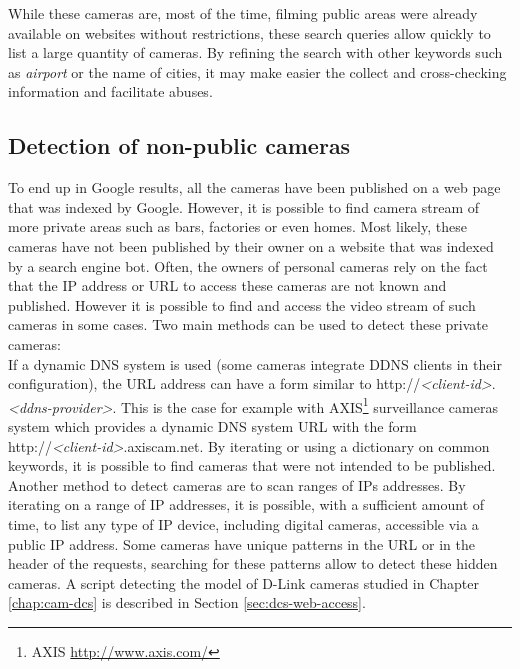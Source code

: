 While these cameras are, most of the time, filming public areas were already available on websites without restrictions, these search queries allow quickly to list a large quantity of cameras.
By refining the search with other keywords such as \emph{airport} or the name of cities, it may make easier the collect and cross-checking information and facilitate abuses.\\

\subsection{Detection of non-public cameras}
\label{sec:cam-detection-hidden}

To end up in Google results, all the cameras have been published on a web page that was indexed by Google.
However, it is possible to find camera stream of more private areas such as bars, factories or even homes.
Most likely, these cameras have not been published by their owner on a website that was indexed by a search engine bot.
Often, the owners of personal cameras rely on the fact that the IP address or URL to access these cameras are not known and published.
However it is possible to find and access the video stream of such cameras in some cases.
Two main methods can be used to detect these private cameras:\\

If a dynamic DNS system is used (some cameras integrate DDNS clients in their configuration), the URL address can have a form similar to http://\emph{\textless client-id\textgreater}.\emph{\textless ddns-provider\textgreater}.
This is the case for example with AXIS\footnote{AXIS \url{http://www.axis.com/}} surveillance cameras system which provides a dynamic DNS system URL with the form http://\emph{\textless client-id\textgreater}.axiscam.net.
By iterating or using a dictionary on common keywords, it is possible to find cameras that were not intended to be published.\\

Another method to detect cameras are to scan ranges of IPs addresses.
By iterating on a range of IP addresses, it is possible, with a sufficient amount of time, to list any type of IP device, including digital cameras, accessible via a public IP address. %
Some cameras have unique patterns in the URL or in the header of the requests, searching for these patterns allow to detect these hidden cameras.
A script detecting the model of D-Link cameras studied in Chapter \ref{chap:cam-dcs} is described in Section \ref{sec:dcs-web-access}.\\

